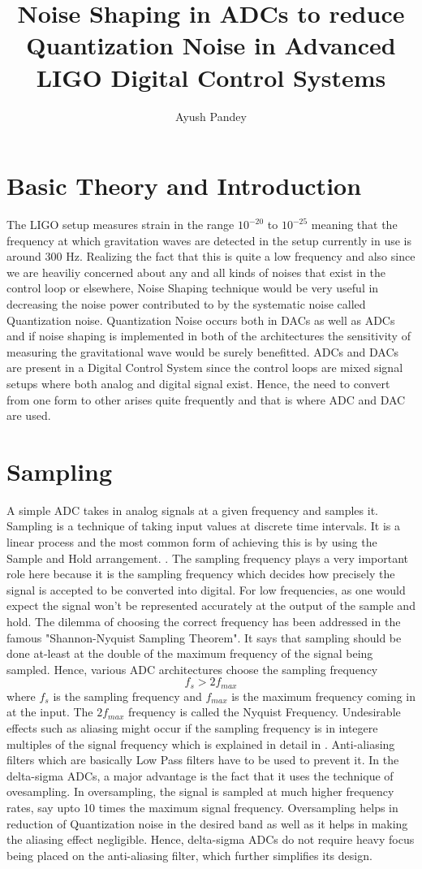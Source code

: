 \documentclass[colorlinks=true,pdfstartview=FitV,linkcolor=blue,
            citecolor=red,urlcolor=magenta]{ligodoc}
\title{Noise Shaping in ADCs to reduce Quantization Noise in Advanced LIGO Digital Control Systems}
\author{Ayush Pandey}
\begin{document}
\section{Basic Theory and Introduction}
 The LIGO setup measures strain in the range $10^{-20}$ to $10^{-25}$ meaning that the frequency at which gravitation waves are detected in the setup currently in use is around 300 Hz. Realizing the fact that this is quite a low frequency and also since we are heaviliy concerned about any and all kinds of noises that exist in the control loop or elsewhere, Noise Shaping technique would be very useful in decreasing the noise power contributed to by the systematic noise called Quantization noise. Quantization Noise occurs both in DACs as well as ADCs and if noise shaping is implemented in both of the architectures the sensitivity of measuring the gravitational wave would be surely benefitted.
 ADCs and DACs are present in a Digital Control System since the control loops are mixed signal setups where both analog and digital signal exist. Hence, the need to convert from one form to other arises quite frequently and that is where ADC and DAC are used. 
\section{Sampling} A simple ADC takes in analog signals at a given frequency and samples it. Sampling is a technique of taking input values at discrete time intervals. It is a linear process and the most common form of achieving this is by using the Sample and Hold arrangement. \cite{Oppenheim}. The sampling frequency plays a very important role here because it is the sampling frequency which decides how precisely the signal is accepted to be converted into digital. For low frequencies, as one would expect the signal won't be represented accurately at the output of the sample and hold. The dilemma of choosing the correct frequency has been addressed in the famous "Shannon-Nyquist Sampling Theorem". It says that sampling should be done at-least at the double of the maximum frequency of the signal being sampled. Hence, various ADC architectures choose the sampling frequency 
 \begin{equation}
 f_{s}>2f_{max}
 \end{equation}
 where $f_{s}$ is the sampling frequency and $f_{max}$ is the maximum frequency coming in at the input. The $2f_{max}$ frequency is called the Nyquist Frequency. 
 Undesirable effects such as aliasing might occur if the sampling frequency is in integere multiples of the signal frequency which is explained in detail in \cite{Oppenheim}. Anti-aliasing filters which are basically Low Pass filters have to be used to prevent it. 
 In the delta-sigma ADCs, a major advantage is the fact that it uses the technique of ovesampling. In oversampling, the signal is sampled at much higher frequency rates, say upto 10 times the maximum signal frequency. Oversampling helps in reduction of Quantization noise in the desired band as well as it helps in making the aliasing effect negligible. Hence, delta-sigma ADCs do not require heavy focus being placed on the anti-aliasing filter, which further simplifies its design.
\end{document}
